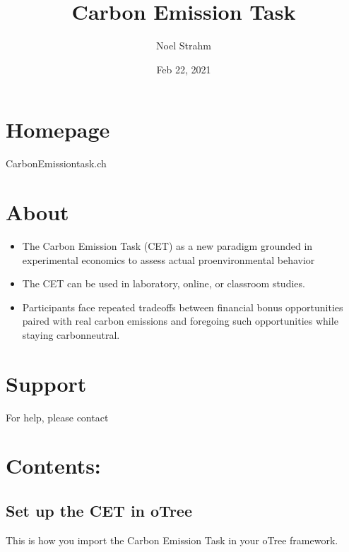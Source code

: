 \documentclass[letterpaper,10pt,english]{sphinxmanual}
\title{Carbon Emission Task}
\date{Feb 22, 2021}
\author{Noel Strahm}
\let\sphinxpxdimen\pdfpxdimen\else\newdimen\sphinxpxdimen
\begin{document}
\pagestyle{empty}
\sphinxmaketitle
\pagestyle{plain}
\sphinxtableofcontents
\pagestyle{normal}
\label{\detokenize{index::doc}}


\noindent{\hspace*{\fill}\sphinxincludegraphics[width=500\sphinxpxdimen,height=293\sphinxpxdimen]{{CET_bild}.png}\hspace*{\fill}}


\chapter{Homepage}
\label{\detokenize{index:homepage}}
Carbon\sphinxhyphen{}Emission\sphinxhyphen{}task.ch


\chapter{About}
\label{\detokenize{index:about}}\begin{itemize}
\item {} 
The Carbon Emission Task (CET) as a new paradigm grounded in experimental economics to assess actual pro\sphinxhyphen{}environmental behavior

\item {} 
The CET can be used in laboratory, online, or classroom studies.

\item {} 
Participants face repeated tradeoffs between financial bonus opportunities paired with real carbon emissions and foregoing such opportunities while staying carbon\sphinxhyphen{}neutral.

\end{itemize}


\chapter{Support}
\label{\detokenize{index:support}}
For help, please contact 


\chapter{Contents:}
\label{\detokenize{index:contents}}



\section{Set up the CET in oTree}
\label{\detokenize{setup_in_otree:set-up-the-cet-in-otree}}\label{\detokenize{setup_in_otree:setup-in-otree}}\label{\detokenize{setup_in_otree::doc}}
This is how you import the Carbon Emission Task in your oTree framework.
\end{document}

